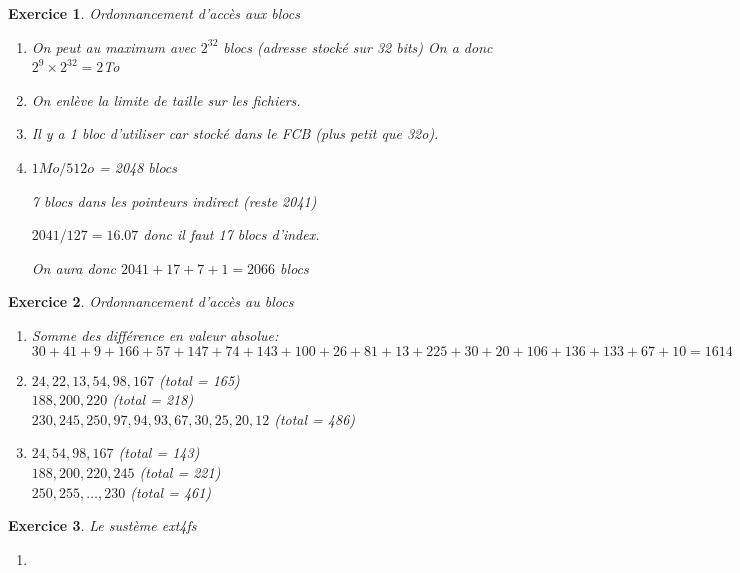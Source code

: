 \documentclass{article}
\theoremstyle{plain}
\newtheorem{exo}{Exercice}%
\begin{document}
\begin{exo}Ordonnancement d'accès aux blocs
\begin{enumerate}
  \item On peut au maximum avec $2^{32}$ blocs (adresse stocké sur 32 bits)
    On a donc $2^9 \times 2^{32} = 2$To

  \item On enlève la limite de taille sur les fichiers.

  \item Il y a 1 bloc d'utiliser car stocké dans le FCB (plus petit que 32o).

  \item $1Mo / 512o$ = 2048 blocs

    7 blocs dans les pointeurs indirect (reste 2041)

    $2041 / 127 = 16.07$ donc il faut 17 blocs d'index.

    On aura donc $2041 + 17 + 7 + 1 = 2066$ blocs
\end{enumerate}
\end{exo}

\begin{exo} Ordonnancement d'accès au blocs
\begin{enumerate}
  \item Somme des différence en valeur absolue:\\
    $30+41+9+166+57+147+74+143 +100+26+81+13+225+30+20
+106+136+133+67+10 = 1614$

  \item $24, 22, 13, 54, 98, 167$ (total = 165)\\
    $188, 200, 220$ (total = 218)\\
    $230, 245, 250, 97, 94, 93, 67, 30, 25, 20, 12$ (total = 486)

  \item $24, 54, 98, 167$ (total = 143)\\
    $188, 200, 220, 245$ (total = 221)\\
    $250, 255, \ldots, 230$ (total = 461)
\end{enumerate}
\end{exo}

\begin{exo}Le sustème ext4fs
\begin{enumerate}
  \item 
\end{enumerate}
\end{exo}
\end{document}
